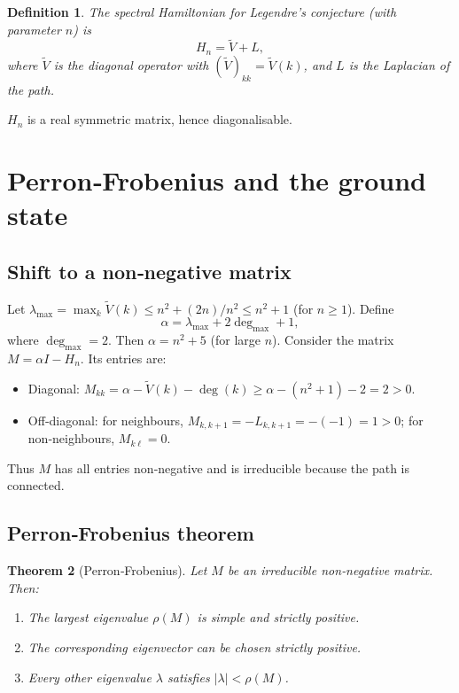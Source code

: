 \documentclass[11pt,a4paper]{article}
\newtheorem{theorem}{Theorem}[section]
\newtheorem{definition}[theorem]{Definition}
\begin{document}
\begin{definition}
The spectral Hamiltonian for Legendre's conjecture (with parameter $n$) is
\[
H_n = \tilde{V} + L,
\]
where $\tilde{V}$ is the diagonal operator with $(\tilde{V})_{kk}=\tilde{V}(k)$, and $L$ is the Laplacian of the path.
\end{definition}

$H_n$ is a real symmetric matrix, hence diagonalisable.

\section{Perron‑Frobenius and the ground state}

\subsection{Shift to a non‑negative matrix}

Let $\lambda_{\max} = \max_k \tilde{V}(k) \le n^2 + (2n)/n^2 \le n^2+1$ (for $n\ge1$). Define
\[
\alpha = \lambda_{\max} + 2\deg_{\max} + 1,
\]
where $\deg_{\max}=2$. Then $\alpha = n^2 + 5$ (for large $n$). Consider the matrix $M = \alpha I - H_n$. Its entries are:
\begin{itemize}
\item Diagonal: $M_{kk} = \alpha - \tilde{V}(k) - \deg(k) \ge \alpha - (n^2+1) - 2 = 2 > 0$.
\item Off‑diagonal: for neighbours, $M_{k,k+1} = -L_{k,k+1} = -(-1) = 1 > 0$; for non‑neighbours, $M_{k\ell}=0$.
\end{itemize}
Thus $M$ has all entries non‑negative and is irreducible because the path is connected.

\subsection{Perron‑Frobenius theorem}

\begin{theorem}[Perron‑Frobenius]
Let $M$ be an irreducible non‑negative matrix. Then:
\begin{enumerate}
\item The largest eigenvalue $\rho(M)$ is simple and strictly positive.
\item The corresponding eigenvector can be chosen strictly positive.
\item Every other eigenvalue $\lambda$ satisfies $|\lambda| < \rho(M)$.
\end{enumerate}
\end{theorem}
\end{document}
